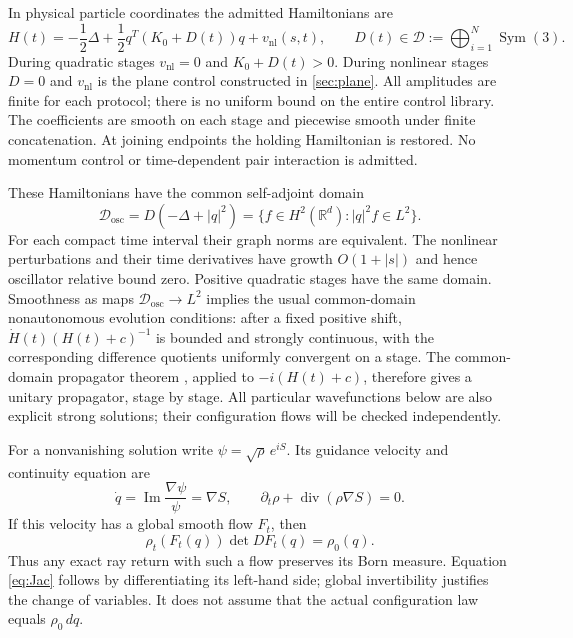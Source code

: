 \documentclass[11pt]{article}
\numberwithin{equation}{section}
\theoremstyle{definition}
\newcommand{\R}{\mathbb R}
\newcommand{\diver}{\operatorname{div}}
\newcommand{\Sym}{\operatorname{Sym}}
\newcommand{\calD}{\mathcal D}
\begin{document}
In physical particle coordinates the admitted Hamiltonians are
\begin{equation}\label{eq:H}
 H(t)=-\frac12\Delta+\frac12q^T(K_0+D(t))q+v_{\mathrm{nl}}(s,t),
 \qquad D(t)\in\calD:=\bigoplus_{i=1}^N\Sym(3).
\end{equation}
During quadratic stages $v_{\mathrm{nl}}=0$ and $K_0+D(t)>0$.
During nonlinear stages $D=0$ and $v_{\mathrm{nl}}$ is the plane
control constructed in \cref{sec:plane}. All amplitudes are finite for
each protocol; there is no uniform bound on the entire control library.
The coefficients are smooth on each stage and piecewise smooth under
finite concatenation. At joining endpoints the holding Hamiltonian is
restored. No momentum control or time-dependent pair interaction is
admitted.

These Hamiltonians have the common self-adjoint domain
\begin{equation}\label{eq:domain}
 \calD_{\mathrm{osc}}=D(-\Delta+|q|^2)
   =\{f\in H^2(\R^d): |q|^2f\in L^2\}.
\end{equation}
For each compact time interval their graph norms are equivalent.
The nonlinear perturbations and their time derivatives have growth
$O(1+|s|)$ and hence oscillator relative bound zero. Positive quadratic
stages have the same domain. Smoothness as maps
$\calD_{\mathrm{osc}}\to L^2$ implies the usual common-domain
nonautonomous evolution conditions: after a fixed positive shift,
$\dot H(t)(H(t)+c)^{-1}$ is bounded and strongly continuous, with the
corresponding difference quotients uniformly convergent on a stage.
The common-domain propagator theorem
\citep[Theorem X.70]{ReedSimonII}, applied to $-i(H(t)+c)$,
therefore gives a unitary propagator, stage by stage.
All particular wavefunctions below are also explicit strong solutions;
their configuration flows will be checked independently.

For a nonvanishing solution write $\psi=\sqrt\rho\,e^{iS}$. Its guidance
velocity and continuity equation are
\begin{equation}\label{eq:guidance}
 \dot q=\operatorname{Im}\frac{\nabla\psi}{\psi}=\nabla S,
 \qquad \partial_t\rho+\diver(\rho\nabla S)=0.
\end{equation}
If this velocity has a global smooth flow $F_t$, then
\begin{equation}\label{eq:Jac}
 \rho_t(F_t(q))\det DF_t(q)=\rho_0(q).
\end{equation}
Thus any exact ray return with such a flow preserves its Born measure.
Equation \eqref{eq:Jac} follows by differentiating its left-hand side;
global invertibility justifies the change of variables. It does not
assume that the actual configuration law equals $\rho_0\,dq$.
\end{document}
